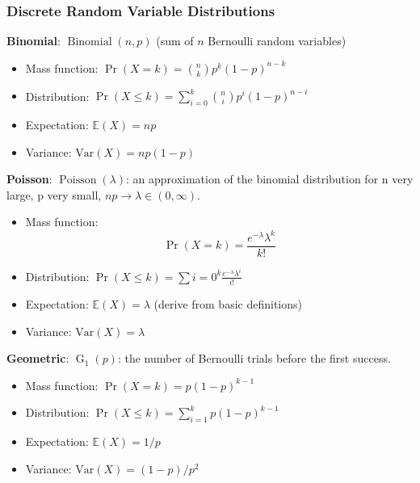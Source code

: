 \documentclass{article}
\newcommand{\E}{\mathbb{E}}
\newcommand{\Var}{\mathrm{Var}}
\begin{document}
\subsubsection{Discrete Random Variable Distributions}

\textbf{Binomial}: \(\operatorname{Binomial}(n, p)\) (sum of \(n\) Bernoulli random variables)

\begin{itemize}

\item Mass function: \(\Pr(X = k) = \binom{n}{k}p^k(1-p)^{n-k}  \)

\item Distribution: \(\Pr(X \leq k) = \sum_{i=0}^k \binom{n}{i}p^i(1-p)^{n-i} \)

\item Expectation: \(\E(X) = np \)

\item Variance: \(\Var(X) = np(1-p) \)

\end{itemize}

\textbf{Poisson}:  \(\operatorname{Poisson}(\lambda)\): an approximation of the binomial distribution for n very large, p very small, \(np \to \lambda \in (0, \infty)\).

\begin{itemize}

\item Mass function: \[\Pr(X = k) =  \frac{e^{-\lambda}\lambda^k}{k!} \]

\item Distribution: \(\Pr(X \leq k) = \sum{i=0}^k  \frac{e^{-\lambda}\lambda^i}{i!}  \)

\item Expectation: \(\E(X) = \lambda \) (derive from basic definitions)

\item Variance: \(\Var(X) = \lambda\)

\end{itemize}

\textbf{Geometric}:  \(\operatorname{G}_1(p)\): the number of Bernoulli trials before the first success.

\begin{itemize}

\item Mass function: \(\Pr(X = k) = p(1-p)^{k-1} \)

\item Distribution: \(\Pr(X \leq k) = \sum_{i=1}^k p(1-p)^{k-1}  \)

\item Expectation: \(\E(X) = 1/p \)

\item Variance: \(\Var(X) = (1-p)/p^2\)

\end{itemize}
\end{document}
